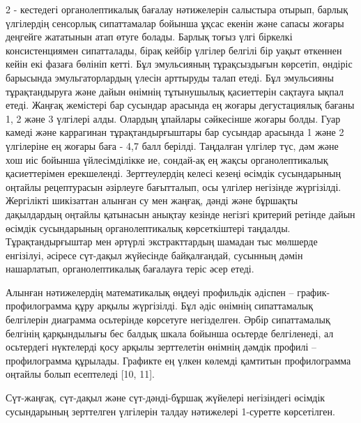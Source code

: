 {2 - кестедегі органолептикалық бағалау нәтижелерін салыстыра отырып,
барлық үлгілердің сенсорлық сипаттамалар бойынша ұқсас екенін және
сапасы жоғары деңгейге жататынын атап өтуге болады. Барлық тоғыз үлгі
біркелкі консистенциямен сипатталады, бірақ кейбір үлгілер белгілі бір
уақыт өткеннен кейін екі фазаға бөлініп кетті. Бұл эмульсияның
тұрақсыздығын көрсетіп, өндіріс барысында эмульгаторлардың үлесін
арттыруды талап етеді. Бұл эмульсияны тұрақтандыруға және дайын өнімнің
тұтынушылық қасиеттерін сақтауға ықпал етеді. Жаңғақ жемістері бар
сусындар арасында ең жоғары дегустациялық бағаны 1, 2 және 3 үлгілері
алды. Олардың ұпайлары сәйкесінше жоғары болды. Гуар камеді және
каррагинан тұрақтандырғыштары бар сусындар арасында 1 және 2 үлгілеріне
ең жоғары баға - 4,7 балл берілді. Таңдалған үлгілер түс, дәм және хош
иіс бойынша үйлесімділікке ие, сондай-ақ ең жақсы органолептикалық
қасиеттерімен ерекшеленді. Зерттеулердің келесі кезеңі өсімдік
сусындарының оңтайлы рецептурасын әзірлеуге бағытталып, осы үлгілер
негізінде жүргізілді. Жергілікті шикізаттан алынған су мен жаңғақ, дәнді
және бұршақты дақылдардың оңтайлы қатынасын анықтау кезінде негізгі
критерий ретінде дайын өсімдік сусындарының органолептикалық
көрсеткіштері таңдалды. Тұрақтандырғыштар мен әртүрлі экстракттардың
шамадан тыс мөлшерде енгізілуі, әсіресе сүт-дақыл жүйесінде
байқалғандай, сусынның дәмін нашарлатып, органолептикалық бағалауға
теріс әсер етеді.

Алынған нәтижелердің математикалық өңдеуі профильдік әдіспен --
график-профилограмма құру арқылы жүргізілді. Бұл әдіс өнімнің
сипаттамалық белгілерін диаграмма осьтерінде көрсетуге негізделген.
Әрбір сипаттамалық белгінің қарқындылығы бес балдық шкала бойынша
осьтерде белгіленеді, ал осьтердегі нүктелерді қосу арқылы зерттелетін
өнімнің дәмдік профилі -- профилограмма құрылады. Графикте ең үлкен
көлемді қамтитын профилограмма оңтайлы болып есептеледі {[}10, 11{]}.

Сүт-жаңғақ, сүт-дақыл және сүт-дәнді-бұршақ жүйелері негізіндегі өсімдік
сусындарының зерттелген үлгілерін талдау нәтижелері 1-суретте
көрсетілген.

}
